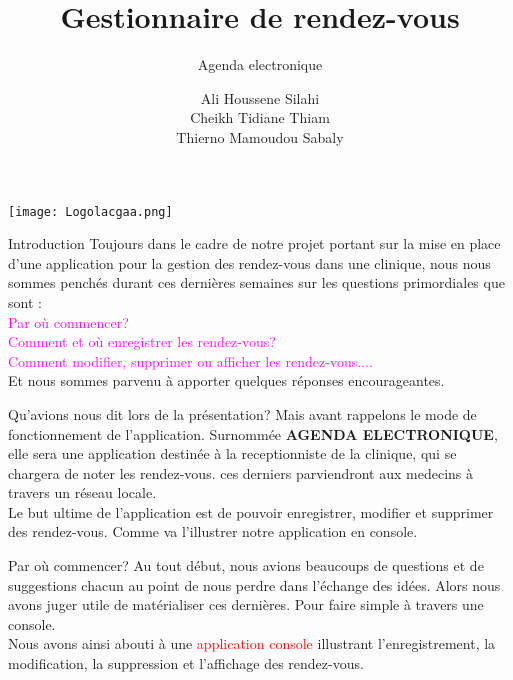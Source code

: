 \documentclass{beamer}
\title{Gestionnaire de rendez-vous}
\subtitle{Agenda electronique}
\institute[2017-2018]{Transmission des Données et Sécurité de l'Information}
\date{}
\author[L1TDSI]{Ali Houssene Silahi\\Cheikh Tidiane Thiam\\Thierno Mamoudou Sabaly}
\begin{document}
\begin{frame}[t]
\texttt{[image: Logolacgaa.png]}
	\titlepage
\end{frame}
\begin{frame}[t]{Introduction}\vspace{3pt}
Toujours dans le cadre de notre projet portant sur la mise en place d'une application pour la gestion des rendez-vous dans une clinique, nous nous sommes penchés durant ces dernières semaines sur les questions primordiales que sont : 
\textcolor{magenta}{\\Par où commencer?\pause \\Comment et où enregistrer les rendez-vous?\pause\\Comment modifier, supprimer ou afficher les rendez-vous....\\}
Et nous sommes parvenu à apporter quelques réponses encourageantes.\\
\end{frame}

\begin{frame}{Qu'avions nous dit lors de la présentation?}
Mais avant rappelons le mode de fonctionnement de l'application. \pause Surnommée \textbf{AGENDA ELECTRONIQUE}, elle sera une application destinée à la receptionniste de la clinique, qui se chargera de noter les rendez-vous. ces derniers parviendront aux medecins à travers un réseau locale. \pause \\Le but ultime de l'application est de pouvoir enregistrer, modifier et supprimer des rendez-vous. Comme va l'illustrer notre application en console. 

\end{frame}
\begin{frame}[t]{Par où commencer?}\vspace{3pt}
Au tout début, nous avions beaucoups de questions et de suggestions chacun au point de nous perdre dans l'échange des idées. Alors nous avons juger utile de matérialiser ces dernières. \pause Pour faire simple à travers une console.\pause \\
Nous avons ainsi abouti à une \textcolor{red}{application console} illustrant l'enregistrement, la modification, la suppression et l'affichage des rendez-vous.\\ 
\end{frame}
\end{document}
